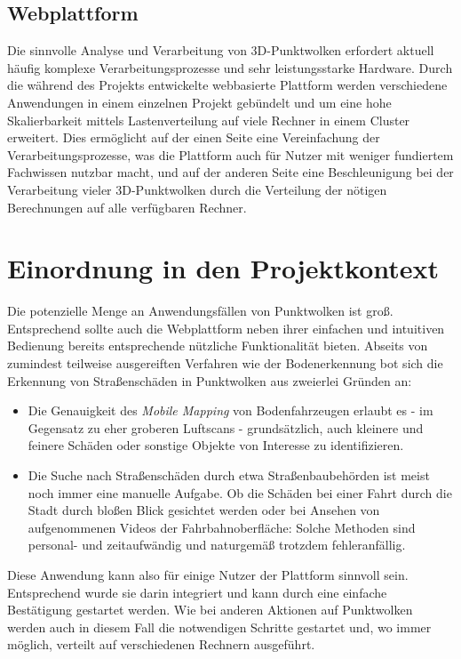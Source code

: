 \subsection{Webplattform}

Die sinnvolle Analyse und Verarbeitung von 3D-Punktwolken erfordert aktuell häufig komplexe Verarbeitungsprozesse und sehr leistungsstarke Hardware. Durch die während des Projekts entwickelte webbasierte Plattform werden verschiedene Anwendungen in einem einzelnen Projekt gebündelt und um eine hohe Skalierbarkeit mittels Lastenverteilung auf viele Rechner in einem Cluster erweitert. Dies ermöglicht auf der einen Seite eine Vereinfachung der Verarbeitungsprozesse, was die Plattform auch für Nutzer mit weniger fundiertem Fachwissen nutzbar macht, und auf der anderen Seite eine Beschleunigung bei der Verarbeitung vieler 3D-Punktwolken durch die Verteilung der nötigen Berechnungen auf alle verfügbaren Rechner.

\section{Einordnung in den Projektkontext}

Die potenzielle Menge an Anwendungsfällen von Punktwolken ist groß. Entsprechend sollte auch die Webplattform neben ihrer einfachen und intuitiven Bedienung bereits entsprechende nützliche Funktionalität bieten. Abseits von zumindest teilweise ausgereiften Verfahren wie der Bodenerkennung bot sich die Erkennung von Straßenschäden in Punktwolken aus zweierlei Gründen an:
\begin{itemize}
    \item Die Genauigkeit des \textit{Mobile Mapping} von Bodenfahrzeugen erlaubt es - im Gegensatz zu eher groberen Luftscans - grundsätzlich, auch kleinere und feinere Schäden oder sonstige Objekte von Interesse zu identifizieren.
    \item Die Suche nach Straßenschäden durch etwa Straßenbaubehörden ist meist noch immer eine manuelle Aufgabe. Ob die Schäden bei einer Fahrt durch die Stadt durch bloßen Blick gesichtet werden oder bei Ansehen von aufgenommenen Videos der Fahrbahnoberfläche: Solche Methoden sind personal- und zeitaufwändig und naturgemäß trotzdem fehleranfällig.
\end{itemize}
Diese Anwendung kann also für einige Nutzer der Plattform sinnvoll sein. Entsprechend wurde sie darin integriert und kann durch eine einfache Bestätigung gestartet werden. Wie bei anderen Aktionen auf Punktwolken werden auch in diesem Fall die notwendigen Schritte gestartet und, wo immer möglich, verteilt auf verschiedenen Rechnern ausgeführt.

